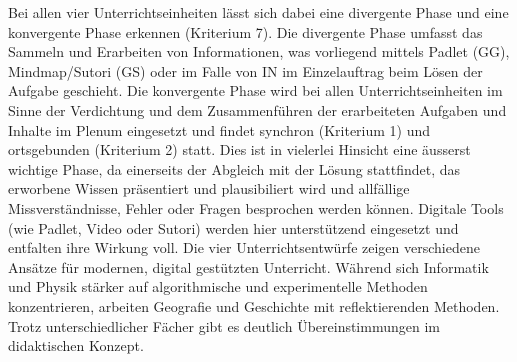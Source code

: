 Bei allen vier Unterrichtseinheiten lässt sich dabei eine divergente Phase und eine konvergente Phase erkennen (Kriterium 7). Die divergente Phase umfasst das Sammeln und Erarbeiten von Informationen, was vorliegend mittels Padlet (GG), Mindmap/Sutori (GS) oder im Falle von IN im Einzelauftrag beim Lösen der Aufgabe geschieht. Die konvergente Phase wird bei allen Unterrichtseinheiten im Sinne der Verdichtung und dem Zusammenführen der erarbeiteten Aufgaben und Inhalte im Plenum eingesetzt und findet synchron (Kriterium 1) und ortsgebunden (Kriterium 2) statt. Dies ist in vielerlei Hinsicht eine äusserst wichtige Phase, da einerseits der Abgleich mit der Lösung stattfindet, das erworbene Wissen präsentiert und plausibiliert wird und allfällige Missverständnisse, Fehler oder Fragen besprochen werden können. Digitale Tools (wie Padlet, Video oder Sutori) werden hier unterstützend eingesetzt und entfalten ihre Wirkung voll.  
Die vier Unterrichtsentwürfe zeigen verschiedene Ansätze für modernen, digital gestützten Unterricht. Während sich Informatik und Physik stärker auf algorithmische und experimentelle Methoden konzentrieren, arbeiten Geografie und Geschichte mit reflektierenden Methoden. Trotz unterschiedlicher Fächer gibt es deutlich Übereinstimmungen im didaktischen Konzept.

